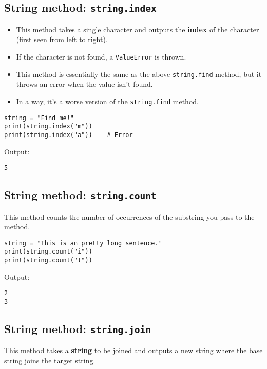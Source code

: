 \documentclass[11pt]{article}
\begin{document}
 \newpage

\subsection{String method: \texttt{string.index}}
\label{sec:org0b938b2}
\begin{itemize}
\item This method takes a single character and outputs the \textbf{index} of the character (first seen from left to right).
\item If the character is not found, a \texttt{ValueError} is thrown.
\item This method is essentially the same as the above \texttt{string.find} method, but it throws an error when the value isn't found.
\item In a way, it's a worse version of the \texttt{string.find} method.
\end{itemize}

\begin{verbatim}
string = "Find me!"
print(string.index("m"))
print(string.index("a"))    # Error
\end{verbatim}

 \noindent Output:

\begin{verbatim}
5
\end{verbatim}

\subsection{String method: \texttt{string.count}}
\label{sec:org0c4d757}
This method counts the number of occurrences of the substring you pass to the method.

\begin{verbatim}
string = "This is an pretty long sentence."
print(string.count("i"))
print(string.count("t"))
\end{verbatim}

 \noindent Output:

\begin{verbatim}
2
3
\end{verbatim}


 \newpage

\subsection{String method: \texttt{string.join}}
\label{sec:org769b635}
This method takes a \textbf{string} to be joined and outputs a new string where the base string joins the target string.
\end{document}

